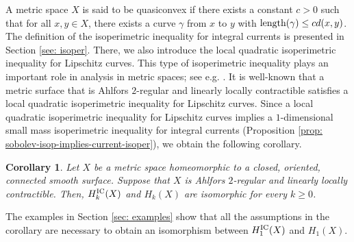 \documentclass{amsart}
\newtheorem{corollary}[theorem]{Corollary}
\numberwithin{equation}{section}
\DeclareMathOperator{\len}{\textup{length}}
\begin{document}
    A metric space $X$ is said to be quasiconvex if there exists a constant $c>0$ such that for all $x,y\in X$, there exists a curve $\gamma$ from $x$ to $y$ with $\len(\gamma) \leq cd(x,y)$. The definition of the isoperimetric inequality for integral currents is presented in Section \ref{see: isoper}. There, we also introduce the local quadratic isoperimetric inequality for Lipschitz curves. This type of isoperimetric inequality plays an important role in analysis in metric spaces; see e.g. \cite{Lytchack-wenger-Canonical-parameterizations, Lytchak-wenger-robert, meier2025monotone}. It is well-known that a metric surface that is Ahlfors $2$-regular and linearly locally contractible satisfies a local quadratic isoperimetric inequality for Lipschitz curves. Since a local quadratic isoperimetric inequality for Lipschitz curves implies a $1$-dimensional small mass isoperimetric inequality for integral currents (Proposition \ref{prop: sobolev-isop-implies-current-isoper}), we obtain the following corollary.
    

    
    \begin{corollary}\label{cor: one-dim-homology-surf}
        Let $X$ be a metric space homeomorphic to a closed, oriented, connected smooth surface. Suppose that $X$ is Ahlfors $2$-regular and linearly locally contractible. Then, $H_k^\textup{IC}(X)$ and $H_k(X)$ are isomorphic for every $k \geq 0$.
    \end{corollary}

    The examples in Section \ref{sec: examples} show that all the assumptions in the corollary are necessary to obtain an isomorphism between $H_1^\textup{IC}(X)$ and $H_1(X)$.
\end{document}

